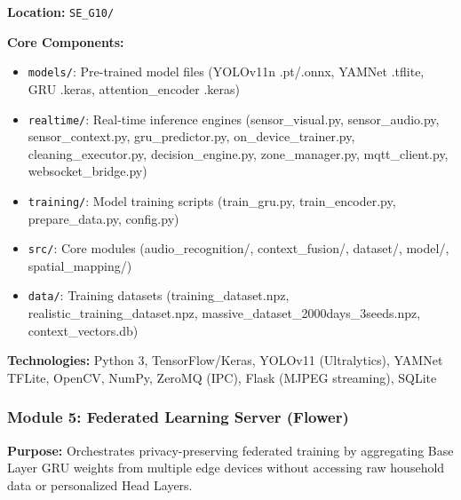\documentclass[conference]{IEEEtran}
\begin{document}
\textbf{Location:} \texttt{SE\_G10/}

\textbf{Core Components:}
\begin{itemize}
    \item \texttt{models/}: Pre-trained model files (YOLOv11n .pt/.onnx, YAMNet .tflite, GRU .keras, attention\_encoder .keras)
    \item \texttt{realtime/}: Real-time inference engines (sensor\_visual.py, sensor\_audio.py, sensor\_context.py, gru\_predictor.py, on\_device\_trainer.py, cleaning\_executor.py, decision\_engine.py, zone\_manager.py, mqtt\_client.py, websocket\_bridge.py)
    \item \texttt{training/}: Model training scripts (train\_gru.py, train\_encoder.py, prepare\_data.py, config.py)
    \item \texttt{src/}: Core modules (audio\_recognition/, context\_fusion/, dataset/, model/, spatial\_mapping/)
    \item \texttt{data/}: Training datasets (training\_dataset.npz, realistic\_training\_dataset.npz, massive\_dataset\_2000days\_3seeds.npz, context\_vectors.db)
\end{itemize}

\textbf{Technologies:} Python 3, TensorFlow/Keras, YOLOv11 (Ultralytics), YAMNet TFLite, OpenCV, NumPy, ZeroMQ (IPC), Flask (MJPEG streaming), SQLite

\subsubsection{Module 5: Federated Learning Server (Flower)}

\textbf{Purpose:} Orchestrates privacy-preserving federated training by aggregating Base Layer GRU weights from multiple edge devices without accessing raw household data or personalized Head Layers.
\end{document}
